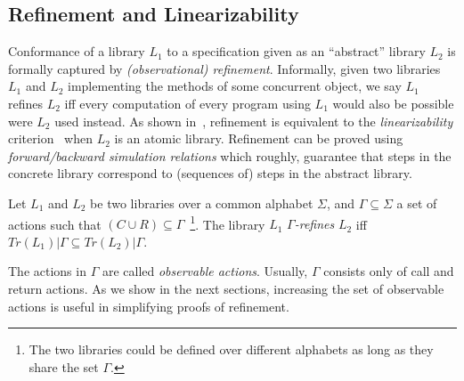 \subsection{Refinement and Linearizability}

Conformance of a library $L_1$ to a specification given as an ``abstract'' library $L_2$ 
is formally captured by \emph{(observational) refinement}. Informally, given two libraries
$L_1$ and $L_2$ implementing the methods of some concurrent object, we
say $L_1$ refines $L_2$ if{f} every computation of every program
using $L_1$ would also be possible were $L_2$ used instead. As shown in~\citet{journals/tcs/FilipovicORY10,DBLP:conf/popl/BouajjaniEEH15},
refinement is equivalent to the \emph{linearizability} criterion~\cite{journals/toplas/HerlihyW90} when $L_2$ is an atomic library. 
Refinement can be proved using \emph{forward/backward simulation relations} which roughly, guarantee that steps
in the concrete library correspond to (sequences of) steps in the abstract library.

\begin{dfn}
Let $L_1$ and $L_2$ be two libraries over a common alphabet $\Sigma$, and $\Gamma\subseteq \Sigma$ a set of actions such that $(C\cup R)\subseteq \Gamma$~\footnote{The two libraries could be defined over different alphabets as long as they share the set $\Gamma$.}. 
The library $L_1$ \emph{$\Gamma$-refines} $L_2$ if{f} $Tr(L_1) | \Gamma \subseteq Tr(L_2) | \Gamma$.
\end{dfn}
The actions in $\Gamma$ are called \emph{observable actions}. Usually, $\Gamma$ consists only of call and return actions. As we show in the next sections, increasing the set of observable actions is useful in simplifying proofs of refinement.

